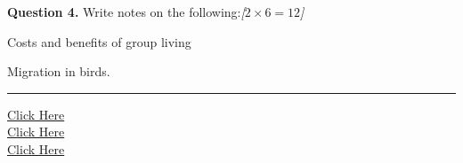 \documentclass[11pt,a4paper]{article}
\newcommand{\pts}[1]{\hfill   \textit{[#1]}}
\begin{document}
\medskip


\noindent   \textbf{Question 4.} Write notes on the following:\pts{$2  \times 6 = 12$}

\begin{parts}
  \item Costs and benefits of group living
  \item Migration in birds.
\end{parts}

\vfill
\rule{\linewidth}{0.4pt}

\begin{center}\small
\href{https://bhu-exam.vercel.app/}{Click Here}\\[4pt]\href{https://me-aryan.vercel.app/}{Click Here}\\[4pt]\href{https://quashan-me.vercel.app/}{Click Here}
\end{center}
\end{document}
